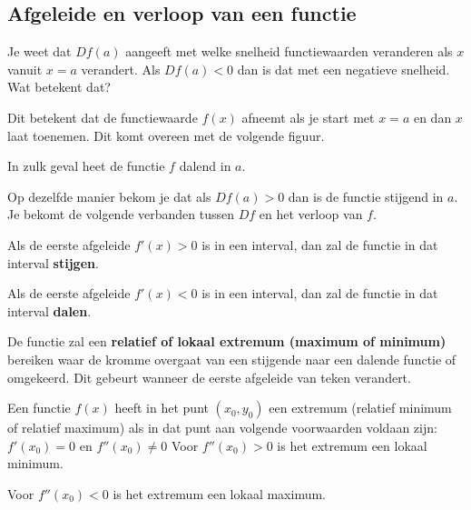 \subsection{Afgeleide en verloop van een functie}

Je weet dat $Df(a)$ aangeeft met welke snelheid functiewaarden veranderen als $x$ vanuit $x=a$ verandert.
Als $Df(a)<0$ dan is dat met een negatieve snelheid. Wat betekent dat?\vspace{5mm}

Dit betekent dat de functiewaarde $f(x)$ afneemt als je start met $x=a$ en dan $x$ laat toenemen.
Dit komt overeen met de volgende figuur.



In zulk geval heet de functie $f$ dalend in $a$.\vspace{5mm}

Op dezelfde manier bekom je dat als $Df(a)>0$ dan is de functie stijgend in $a$.
Je bekomt de volgende verbanden tussen $Df$ en het verloop van $f$.

\begin{eigenschap}
Als de eerste afgeleide $f'(x)>0$  is in een interval, dan zal de functie in dat interval \textbf{stijgen}.

Als de eerste afgeleide $f'(x)<0$ is in een interval, dan zal de functie in dat interval \textbf{dalen}.

De functie zal een \textbf{relatief of lokaal extremum (maximum of minimum)} bereiken waar de kromme overgaat van een stijgende naar een dalende functie of omgekeerd. Dit gebeurt wanneer de eerste afgeleide van teken verandert.

Een functie $f(x)$  heeft in het punt $(x_0,y_0)$ een extremum (relatief minimum of relatief maximum) als in dat punt aan volgende voorwaarden voldaan zijn:
$f'(x_0)=0$
en $f''(x_0)\ne 0$
Voor $f''(x_0)> 0$ is het extremum een lokaal minimum.

Voor $f''(x_0)< 0$ is het extremum een lokaal maximum.
\end{eigenschap}

